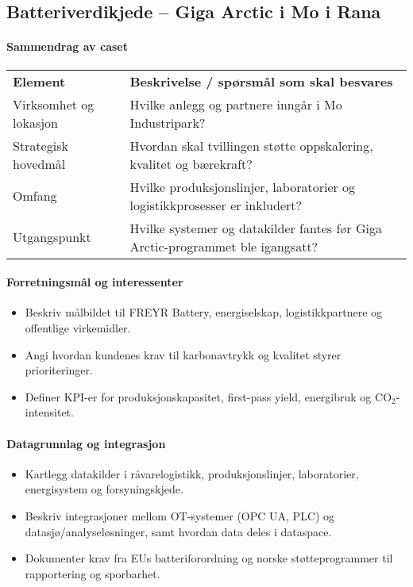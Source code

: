 \subsection{Batteriverdikjede – Giga Arctic i Mo i Rana}
\paragraph{Sammendrag av caset}
\begin{tabular}{p{}p{}}
\textbf{Element} & \textbf{Beskrivelse / spørsmål som skal besvares} \\
Virksomhet og lokasjon & Hvilke anlegg og partnere inngår i Mo Industripark? \\
Strategisk hovedmål & Hvordan skal tvillingen støtte oppskalering, kvalitet og bærekraft? \\
Omfang & Hvilke produksjonslinjer, laboratorier og logistikkprosesser er inkludert? \\
Utgangspunkt & Hvilke systemer og datakilder fantes før Giga Arctic-programmet ble igangsatt? \\
\end{tabular}

\paragraph{Forretningsmål og interessenter}
\begin{itemize}
    \item Beskriv målbildet til FREYR Battery, energiselskap, logistikkpartnere og offentlige virkemidler.\citep{freyr2024giga,enova2023batteri}
    \item Angi hvordan kundenes krav til karbonavtrykk og kvalitet styrer prioriteringer.
    \item Definer KPI-er for produksjonskapasitet, first-pass yield, energibruk og CO$_2$-intensitet.
\end{itemize}

\paragraph{Datagrunnlag og integrasjon}
\begin{itemize}
    \item Kartlegg datakilder i råvarelogistikk, produksjonslinjer, laboratorier, energisystem og forsyningskjede.
    \item Beskriv integrasjoner mellom OT-systemer (OPC UA, PLC) og datasjø/analyseløsninger, samt hvordan data deles i dataspace.\citep{gaiax2023architecture}
    \item Dokumenter krav fra EUs batteriforordning og norske støtteprogrammer til rapportering og sporbarhet.\citep{eu2023batteryregulation,enova2023batteri}
\end{itemize}

